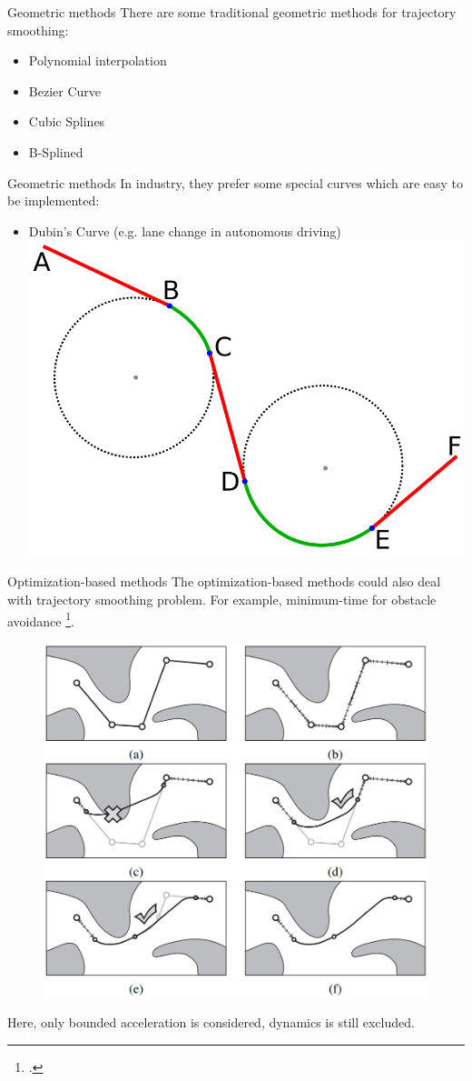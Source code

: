 \documentclass{beamer}
\begin{document}
\begin{frame}{Geometric methods}
	There are some traditional geometric methods for trajectory smoothing:
	\begin{itemize}
		\item Polynomial interpolation
		\item Bezier Curve
		\item Cubic Splines
		\item B-Splined
	\end{itemize}
\end{frame}

\begin{frame}{Geometric methods}
	In industry, they prefer some special curves which are easy to be implemented:
	\begin{itemize}
		\item Dubin’s Curve (e.g. lane change in autonomous driving)
		\includegraphics[width=0.5\linewidth]{figures/dubin-curve.png}
	\end{itemize}
\end{frame}

\begin{frame}{Optimization-based methods}
	The optimization-based methods could also deal with trajectory smoothing problem. For example, minimum-time for obstacle avoidance \footcite{hauser2010fast}.
	\begin{figure}
		\includegraphics[width=0.4\linewidth]{figures/trajectory-smooth-optimal-bounded-acceleration.png}
	\end{figure}
	Here, only bounded acceleration is considered, dynamics is still excluded.
\end{frame}
\end{document}
